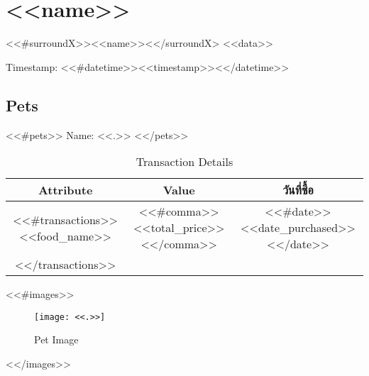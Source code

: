 \section{ <<name>> }
<<#surroundX>><<name>><</surroundX>
<<data>>

Timestamp: <<#datetime>><<timestamp>><</datetime>>

\subsection{Pets}
<<#pets>>
Name: <<.>>
<</pets>>

\begin{table}[h!]
\centering
\begin{tabular}{|c|c|c|}
\hline
Attribute & Value & วันที่ซื้อ \\ \hline
<<#transactions>>
<<food_name>> & <<#comma>><<total_price>><</comma>> & <<#date>><<date_purchased>><</date>> \\
<</transactions>>
\hline
\end{tabular}
\caption{Transaction Details}
\end{table}

<<#images>>
\begin{figure}[h!]
\centering
\texttt{[image: <<.>>]}
\caption{Pet Image}
\end{figure}
<</images>>
